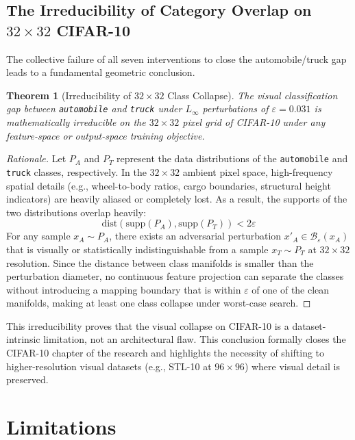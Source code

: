 \documentclass[12pt,a4paper]{article}
\newtheorem{theorem}{Theorem}[section]
\begin{document}
\subsection{The Irreducibility of Category Overlap on $32\times32$ CIFAR-10}

The collective failure of all seven interventions to close the automobile/truck gap leads to a fundamental geometric conclusion.

\begin{theorem}[Irreducibility of $32{\times}32$ Class Collapse]
The visual classification gap between \texttt{automobile} and \texttt{truck} under $L_\infty$ perturbations of $\varepsilon=0.031$ is mathematically irreducible on the $32{\times}32$ pixel grid of CIFAR-10 under any feature-space or output-space training objective.
\end{theorem}

\begin{proof}[Rationale]
Let $P_A$ and $P_T$ represent the data distributions of the \texttt{automobile} and \texttt{truck} classes, respectively. In the $32\times32$ ambient pixel space, high-frequency spatial details (e.g., wheel-to-body ratios, cargo boundaries, structural height indicators) are heavily aliased or completely lost. As a result, the supports of the two distributions overlap heavily:
\begin{equation}
\text{dist}(\text{supp}(P_A), \text{supp}(P_T)) < 2\varepsilon
\end{equation}
For any sample $x_A \sim P_A$, there exists an adversarial perturbation $x'_A \in \mathcal{B}_\varepsilon(x_A)$ that is visually or statistically indistinguishable from a sample $x_T \sim P_T$ at $32\times32$ resolution. Since the distance between class manifolds is smaller than the perturbation diameter, no continuous feature projection can separate the classes without introducing a mapping boundary that is within $\varepsilon$ of one of the clean manifolds, making at least one class collapse under worst-case search.
\end{proof}

This irreducibility proves that the visual collapse on CIFAR-10 is a dataset-intrinsic limitation, not an architectural flaw. This conclusion formally closes the CIFAR-10 chapter of the research and highlights the necessity of shifting to higher-resolution visual datasets (e.g., STL-10 at $96\times96$) where visual detail is preserved.


\section{Limitations}
\label{sec:limitations}
\end{document}
